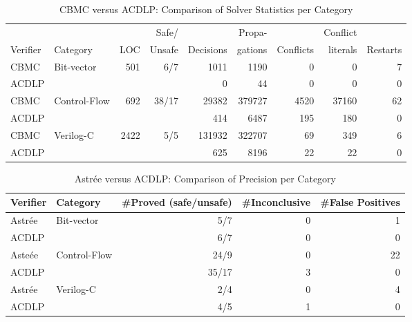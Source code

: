 \documentclass{article}
\begin{document}
\begin{table}[!b]
\begin{center}
{
\begin{tabular}{l|l|r|r|r|r|r|r|r}
\hline
           &          &     & Safe/  &           & Propa-  &           & Conflict &          \\
  Verifier & Category & LOC & Unsafe & Decisions & gations & Conflicts & literals & Restarts \\ \hline
  CBMC & \multirow{2}{*}{Bit-vector} & \multirow{2}{*}{501} &
  \multirow{2}{*}{6/7} & 1011 & 1190 & 0 & 0 & 7 \\
  ACDLP & & & & 0 & 44 & 0 & 0 & 0 \\ \hline
  CBMC & \multirow{2}{*}{Control-Flow} & \multirow{2}{*}{692} & 
  \multirow{2}{*}{38/17} & 29382 & 379727 & 4520 & 37160 & 62 \\ 
  ACDLP & & & & 414 & 6487 & 195 & 180 & 0  \\ \hline
  CBMC & \multirow{2}{*}{Verilog-C} & \multirow{2}{*}{2422} & 
  \multirow{2}{*}{5/5} & 131932 & 322707 & 69 & 349 & 6 \\ 
  ACDLP & & & & 625 & 8196 & 22 & 22 & 0 \\ \hline
\end{tabular}
}
\end{center}
\caption{CBMC versus ACDLP: Comparison of Solver Statistics per Category}
\label{detailed_result}
\end{table}
%
%
\begin{table}[t]
\begin{center}
{
\begin{tabular}{l|l|r|r|r}
\hline
  Verifier & Category & \#Proved (safe/unsafe) & \#Inconclusive & \#False Positives \\ \hline
  Astr{\'e}e & \multirow{2}{*}{Bit-vector} & 5/7 & 0 & 1 \\
  ACDLP & & 6/7 & 0 & 0 \\ \hline
  Aste{\'e}e & \multirow{2}{*}{Control-Flow} & 24/9 & 0 & 22 \\
  ACDLP & & 35/17 & 3 & 0 \\ \hline
  Astr{\'e}e & \multirow{2}{*}{Verilog-C} & 2/4 & 0 & 4 \\
  ACDLP & & 4/5 & 1 & 0 \\ \hline
\end{tabular}
}
\end{center}
  \caption{Astr{\'e}e versus ACDLP: Comparison of Precision per Category}
\label{ai-result}
\end{table}
%
\end{document}
